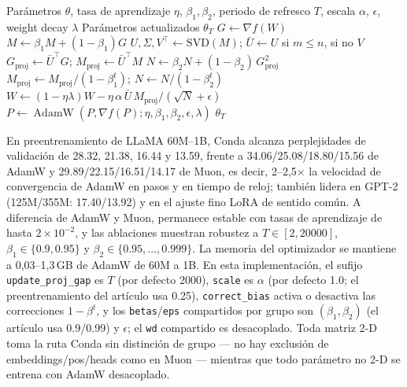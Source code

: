 \begin{algorithm}[H]
\caption{Conda (Adam Normalizado por Columnas)}
\label{alg:conda}
\begin{algorithmic}[1]
\Require Parámetros $\theta$, tasa de aprendizaje $\eta$, $\beta_1,\beta_2$, periodo de refresco $T$, escala $\alpha$, $\epsilon$, weight decay $\lambda$
\Ensure Parámetros actualizados $\theta_T$
        \State $G \gets \nabla f(W)$ 
        \State $M \gets \beta_1 M + (1-\beta_1) G$ 
            \State $U,\Sigma,V^\top \gets \mathrm{SVD}(M)$;\; $\bar U \gets U$ si $m\le n$, si no $V$ 
        \EndIf
        \State $G_{\mathrm{proj}} \gets \bar U^\top G$;\; $M_{\mathrm{proj}} \gets \bar U^\top M$ 
        \State $N \gets \beta_2 N + (1-\beta_2)\, G_{\mathrm{proj}}^2$ 
        \State $M_{\mathrm{proj}} \gets M_{\mathrm{proj}}/(1-\beta_1^t)$;\; $N \gets N/(1-\beta_2^t)$ 
        \State $W \gets (1-\eta\lambda) W - \eta\,\alpha\,\bar U\, M_{\mathrm{proj}}/(\sqrt{N}+\epsilon)$ 
    \Else
        \State $P \gets \operatorname{AdamW}(P, \nabla f(P); \eta, \beta_1, \beta_2, \epsilon, \lambda)$ 
    \EndIf
\EndFor
\Return $\theta_T$
\end{algorithmic}
\end{algorithm}

En preentrenamiento de LLaMA 60M--1B, Conda alcanza perplejidades de validación de 28.32,
21.38, 16.44 y 13.59, frente a 34.06/25.08/18.80/15.56 de AdamW y 29.89/22.15/16.51/14.17
de Muon, es decir, 2--2,5$\times$ la velocidad de convergencia de AdamW en pasos y en
tiempo de reloj; también lidera en GPT-2 (125M/355M: 17.40/13.92) y en el ajuste fino
LoRA de sentido común. A diferencia de AdamW y Muon, permanece estable con tasas de
aprendizaje de hasta $2\times10^{-2}$, y las ablaciones muestran robustez a
$T \in [2, 20000]$, $\beta_1 \in \{0.9, 0.95\}$ y
$\beta_2 \in \{0.95,\ldots,0.999\}$. La memoria del optimizador se mantiene a
0,03--1,3\,GB de AdamW de 60M a 1B. En esta implementación, el sufijo
\texttt{update\_proj\_gap} es $T$ (por defecto 2000), \texttt{scale} es $\alpha$ (por
defecto 1.0; el preentrenamiento del artículo usa 0.25), \texttt{correct\_bias} activa o
desactiva las correcciones $1-\beta^t$, y los \texttt{betas}/\texttt{eps} compartidos por
grupo son $(\beta_1,\beta_2)$ (el artículo usa 0.9/0.99) y $\epsilon$; el \texttt{wd}
compartido es desacoplado. Toda matriz 2-D toma la ruta Conda sin distinción de grupo ---
no hay exclusión de embeddings/pos/heads como en Muon --- mientras que todo parámetro no
2-D se entrena con AdamW desacoplado.

